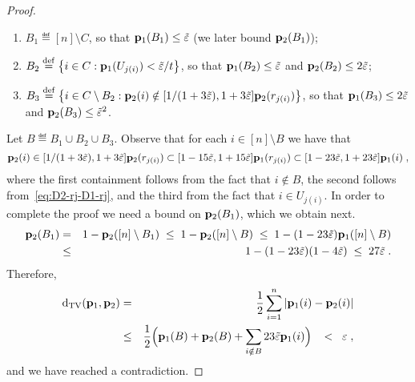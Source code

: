 \begin{proof}
\begin{enumerate}
\item $B_1 \eqdef [n]\setminus C$,
so that $\mathbf{p}_1(B_1) \leq \tilde{\varepsilon}$ (we later bound $\mathbf{p}_2(B_1)$);
\item $B_2 \stackrel{\rm def}{=}
   \left\{i\in C:\mathbf{p}_1(U_{j(i)}) < \tilde{\varepsilon}/t\right\}$, so that
     $\mathbf{p}_1(B_2) \leq \tilde{\varepsilon}$
     and $\mathbf{p}_2(B_2) \leq 2\tilde{\varepsilon}$;
\item $B_3\stackrel{\rm def}{=} \left\{i\in C\setminus B_2:
         \mathbf{p}_2(i) \notin
          [1/(1+3\tilde{\varepsilon}),1+3\tilde{\varepsilon}]\mathbf{p}_2(r_{j(i)})\right\}$, so that
          $\mathbf{p}_1(B_3) \leq 2\tilde{\varepsilon}$ and \mbox{$\mathbf{p}_2(B_3)\leq \tilde{\varepsilon}^2$.}
\end{enumerate}
Let $B \eqdef B_1\cup B_2\cup B_3$.
Observe that for each $i \in [n]\setminus B$
we have that
\begin{equation}\label{eq:D2-i-D1-i}
\mathbf{p}_2(i) \in [1/(1+3\tilde{\varepsilon}),1+3\tilde{\varepsilon}]\mathbf{p}_2(r_{j(i)})
  \subset [1-{15}\tilde{\varepsilon},1+{15}\tilde{\varepsilon}]\mathbf{p}_1(r_{j(i)})     \subset [1-{23}\tilde{\varepsilon},1+{23}\tilde{\varepsilon}]\mathbf{p}_1(i)\;,
\end{equation}
where the first containment follows from the fact that
$i \notin B$, the second follows
from~\cref{eq:D2-rj-D1-rj}, and the third from
the fact that $i\in U_{j(i)}$.
In order to complete the proof we need a bound on $\mathbf{p}_2(B_1)$,
which we obtain next.
\begin{eqnarray}
\mathbf{p}_2(B_1) &=& 1-\mathbf{p}_2([n]\setminus B_1) \;\leq\; 1-\mathbf{p}_2([n]\setminus B)
 \;\leq\; 1 - (1-{23}\tilde{\varepsilon})\mathbf{p}_1([n]\setminus B)\nonumber \\
 & \leq& 1- (1-{23}\tilde{\varepsilon})(1-{4}\tilde{\varepsilon}) \; \leq\; {27}\tilde{\varepsilon}\;.
\end{eqnarray}
Therefore,
\begin{eqnarray}
\operatorname{d}_{\textrm{TV}}(\mathbf{p}_1,\mathbf{p}_2) &=& \frac{1}{2}\sum_{i=1}^n \left|\mathbf{p}_1(i)-\mathbf{p}_2(i)\right|
          \nonumber \\
&\leq& \frac{1}{2}
  \Big(\mathbf{p}_1(B) + \mathbf{p}_2(B)
  + \sum_{i\notin B} {23}\tilde{\varepsilon}\mathbf{p}_1(i)\Big)\;\; \;<\; \;\varepsilon\;,
\end{eqnarray}
and we have reached a contradiction.
\end{proof}

